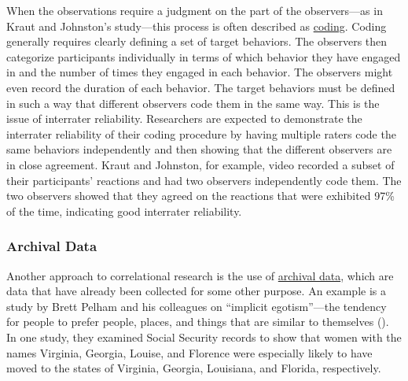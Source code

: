 \documentclass[
]{krantz}
\begin{document}
When the observations require a judgment on the part of the observers---as in Kraut and Johnston's study---this process is often described as \hyperref[coding]{coding}. Coding generally requires clearly defining a set of target behaviors. The observers then categorize participants individually in terms of which behavior they have engaged in and the number of times they engaged in each behavior. The observers might even record the duration of each behavior. The target behaviors must be defined in such a way that different observers code them in the same way. This is the issue of interrater reliability. Researchers are expected to demonstrate the interrater reliability of their coding procedure by having multiple raters code the same behaviors independently and then showing that the different observers are in close agreement. Kraut and Johnston, for example, video recorded a subset of their participants' reactions and had two observers independently code them. The two observers showed that they agreed on the reactions that were exhibited 97\% of the time, indicating good interrater reliability.

\subsubsection*{Archival Data}\label{archival-data}


Another approach to correlational research is the use of \hyperref[archival-data]{archival data}, which are data that have already been collected for some other purpose. An example is a study by Brett Pelham and his colleagues on ``implicit egotism''---the tendency for people to prefer people, places, and things that are similar to themselves (). In one study, they examined Social Security records to show that women with the names Virginia, Georgia, Louise, and Florence were especially likely to have moved to the states of Virginia, Georgia, Louisiana, and Florida, respectively.
\end{document}
